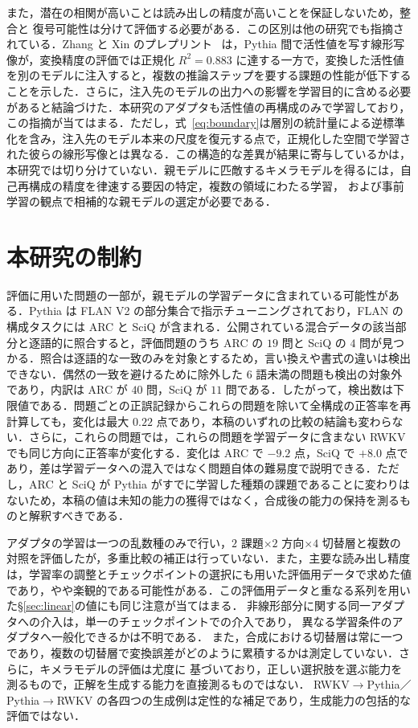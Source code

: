 \documentclass[techrep,noauthor]{ipsj}
\newcommand{\rev}[1]{{\color{blue}#1}}
\newcommand{\revr}[1]{{\color{red}#1}}
\newcommand{\revp}[1]{{\color{violet}#1}}
\newcommand{\revy}[1]{{\color{revyellow}#1}}
\newcommand{\RtoP}{\textsf{RWKV$\to$\allowbreak Pythia}}
\newcommand{\PtoR}{\textsf{Pythia$\to$\allowbreak RWKV}}
\begin{document}
また，潜在の相関が高いことは読み出しの精度が高いことを保証しないため，\revp{整合}と
復号可能性は分けて評価する必要がある．この区別は他の研究でも指摘されている．\rev{Zhang と Xin のプレプリント~\cite{zhang2026negativeresultcrossmodelactivation} は，Pythia 間で活性値を写す線形写像が，変換精度の評価では正規化 $R^2=0.883$ に達する一方で，変換した活性値を別のモデルに注入すると，複数の推論ステップを要する課題の性能が低下することを示した．さらに，注入先のモデルの出力への影響を学習目的に含める必要があると結論づけた．本研究のアダプタも活性値の再構成のみで学習しており，この指摘が当てはまる．ただし，式~\eqref{eq:boundary}は層別の統計量による逆標準化を含み，注入先のモデル本来の尺度を復元する点で，正規化した空間で学習された彼らの線形写像とは異なる．}この構造的な差異が結果に寄与しているかは，本研究では切り分けていない．\rev{親モデルに匹敵するキメラモデル}を得るには，自己再構成の精度を律速する要因の特定，複数の領域にわたる学習，
および事前学習の観点で相補的な親モデルの選定が必要である．

\section{\rev{本研究の制約}}\label{sec:limitations}
\rev{評価に用いた問題の一部が，親モデルの学習データに含まれている可能性がある．}Pythia は FLAN V2 の部分集合で指示チューニングされており，FLAN の構成タスクには ARC と SciQ が含まれる．公開されている混合データの該当部分と逐語的に照合すると，評価問題のうち \revp{ARC} の $19$ 問と SciQ の $4$ 問が見つかる．照合は逐語的な一致のみを対象とするため，言い換えや書式の違いは検出できない．偶然の一致を避けるために除外した $6$ 語未満の問題も検出の対象外であり，内訳は \revp{ARC} が $40$ 問，SciQ が $11$ 問である．したがって，検出数は下限値である．問題ごとの正誤記録からこれらの問題を除いて全構成の正答率を再計算しても，変化は最大 $0.22$ 点であり，本稿のいずれの比較の結論も変わらない．さらに，これらの問題では，\rev{これらの問題を学習データに含まない} RWKV でも同じ方向に正答率が変化する．変化は ARC で $-9.2$ 点，SciQ で $+8.0$ 点であり，差は\rev{学習データへの混入}ではなく問題自体の難易度で説明できる．ただし，\revp{ARC} と SciQ が \revp{Pythia} がすでに学習した種類の課題であることに変わりはないため，本稿の値は未知の能力の獲得ではなく，合成後の能力の保持を測るものと解釈すべきである．

\rev{アダプタの学習は一つの乱数種のみで行い，$2$ 課題$\times2$ 方向$\times4$ 切替層と複数の対照を評価したが，多重比較の補正は行っていない．}\revr{また，主要な読み出し精度は，学習率の調整とチェックポイントの選択にも用いた評価用データで求めた値であり，やや楽観的である可能性がある．\revy{この評価用データと重なる系列を用いた\S\ref{sec:linear}の値にも同じ注意が当てはまる．}}
\rev{非線形部分}に関する同一アダプタへの介入は，単一のチェックポイントでの介入であり，
異なる学習条件のアダプタへ一般化できるかは不明である．
また，合成における\rev{切替層}は常に一つであり，複数の\rev{切替層}で\rev{変換誤差}がどのように累積するかは測定していない．さらに，キメラモデルの評価は尤度に
基づいており，正しい選択肢を選ぶ能力を測るもので，正解を生成する能力を直接測るものではない．
\RtoP{}／\PtoR{} の各四つの生成例は定性的な補足であり，生成能力の包括的な評価ではない．
\end{document}
